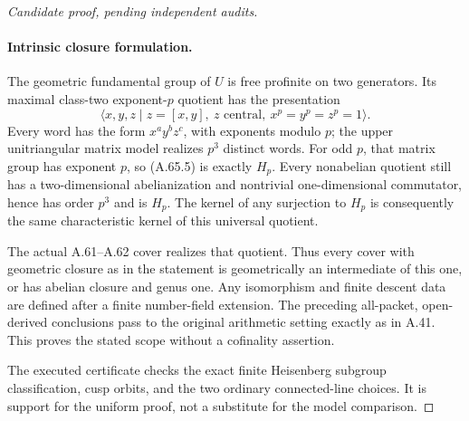 \begin{proof}[Candidate proof, pending independent audits]
\paragraph{Intrinsic closure formulation.}
The geometric fundamental group of \(U\)
is free profinite on two generators. Its
maximal class-two exponent-\(p\) quotient
has the presentation
\[
 \langle x,y,z\mid z=[x,y],\ z\text{ central},
                      \ x^p=y^p=z^p=1\rangle.         \tag{A.65.5}
\]
Every word has the form \(x^a y^b z^c\),
with exponents modulo \(p\); the upper
unitriangular matrix model realizes
\(p^3\) distinct words. For odd \(p\),
that matrix group has exponent \(p\),
so (A.65.5) is exactly \(H_p\).
Every nonabelian quotient still has a
two-dimensional abelianization and
nontrivial one-dimensional commutator,
hence has order \(p^3\) and is \(H_p\).
The kernel of any surjection to \(H_p\)
is consequently the same characteristic
kernel of this universal quotient.

The actual A.61--A.62 cover realizes that
quotient. Thus every cover with geometric
closure as in the statement is geometrically
an intermediate of this one, or has abelian
closure and genus one. Any isomorphism and
finite descent data are defined after a
finite number-field extension. The preceding
all-packet, open-derived conclusions pass
to the original arithmetic setting exactly
as in A.41. This proves the stated scope
without a cofinality assertion.

The executed certificate
checks the exact finite Heisenberg subgroup
classification, cusp orbits, and the two
ordinary connected-line choices. It is
support for the uniform proof, not a
substitute for the model comparison.
\end{proof}
